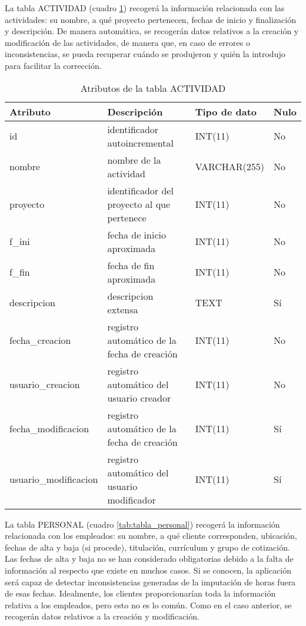 La tabla ACTIVIDAD (cuadro \ref{tab:tabla_actividad}) recogerá la información
relacionada con las actividades: su nombre, a qué proyecto pertenecen, fechas
de inicio y finalización y descripción. De manera automática, se recogerán
datos relativos a la creación y modificación de las actividades, de manera que,
en caso de errores o inconsistencias, se pueda recuperar cuándo se produjeron y
quién la introdujo para facilitar la corrección.

\begin{table}
\small
\centering
\begin{tabular}{|l|p{2in}|l|l|}\hline
\textbf{Atributo} & \textbf{Descripción} & \textbf{Tipo de dato} &
\textbf{Nulo} \\\hline\hline
id & identificador autoincremental & INT(11) & No\\\hline
nombre & nombre de la actividad & VARCHAR(255) & No\\\hline
proyecto & identificador del proyecto al que pertenece & INT(11) & No\\\hline
f\_ini & fecha de inicio aproximada & INT(11) & No\\\hline
f\_fin & fecha de fin aproximada & INT(11) & No\\\hline
descripcion & descripcion extensa & TEXT & Sí\\\hline
fecha\_creacion & registro automático de la fecha de creación & INT(11) &
No\\\hline
usuario\_creacion & registro automático del usuario creador & INT(11) &
No\\\hline
fecha\_modificacion & registro automático de la fecha de creación & INT(11) &
Sí\\\hline
usuario\_modificacion & registro automático del usuario modificador & INT(11) &
Sí\\\hline
\end{tabular}
\caption{Atributos de la tabla ACTIVIDAD}
\label{tab:tabla_actividad}
\end{table}

La tabla PERSONAL (cuadro \ref{tab:tabla_personal}) recogerá la información
relacionada con los empleados: su nombre, a qué cliente corresponden,
ubicación, fechas de alta y baja (si procede), titulación, currículum y grupo
de cotización. Las fechas de alta y baja no se han considerado obligatorias
debido a la falta de información al respecto que existe en muchos casos. Si se
conocen, la aplicación será capaz de detectar inconsistencias generadas de la
imputación de horas fuera de esas fechas. Idealmente, los clientes
proporcionarían toda la información relativa a los empleados, pero esto no es lo
común. Como en el caso anterior, se recogerán datos relativos a la creación y
modificación.


